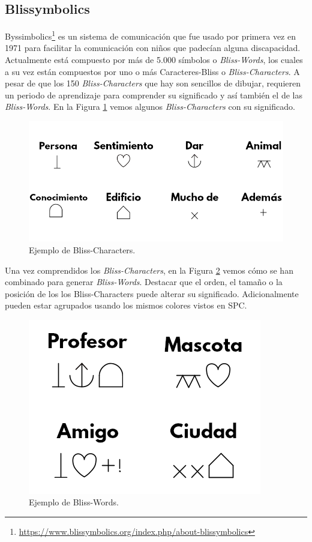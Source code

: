 \subsection{Blissymbolics}
\label{cap3:sec:Blissymbolics}
Byssimbolics\footnote{\url{https://www.blissymbolics.org/index.php/about-blissymbolics}}
es un sistema de comunicación que fue usado por primera vez en 1971 para facilitar la comunicación con niños que padecían alguna discapacidad. Actualmente está compuesto por más de 5.000 símbolos o  \textit{Bliss-Words}, los cuales a su vez están compuestos por uno o más Caracteres-Bliss o  \textit{Bliss-Characters}. A pesar de que los 150 \textit{Bliss-Characters} que hay son sencillos de dibujar, requieren un periodo de aprendizaje para comprender su significado y así también el de las \textit{Bliss-Words}. En la Figura \ref{fig:blisscharacters} vemos algunos \textit{Bliss-Characters} con su significado. \\

\begin{figure}[h!]
	\centering
	\includegraphics[width=0.8\linewidth]{Imagenes/Bitmap/BlissCharacters}
	\caption[Ejemplo de Bliss-Characters]{Ejemplo de Bliss-Characters.}
	\label{fig:blisscharacters}
\end{figure}
Una vez comprendidos los \textit{Bliss-Characters}, en la Figura \ref{fig:blissword} vemos cómo se han combinado para generar \textit{Bliss-Words}. Destacar que el orden, el tamaño o la posición de los los Bliss-Characters puede alterar su significado. Adicionalmente pueden estar agrupados usando los mismos colores vistos en SPC.

\begin{figure}[h!]
	\centering
	\includegraphics[width=0.4\linewidth]{Imagenes/Bitmap/BlissWord}
	\caption[Ejemplo de Bliss-Words]{Ejemplo de Bliss-Words.}
	\label{fig:blissword}
\end{figure}



